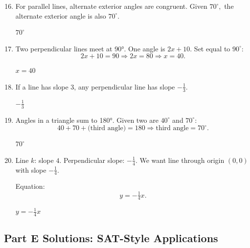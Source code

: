 \documentclass[14pt]{extarticle}
\begin{document}
\begin{enumerate}
  \setcounter{enumi}{15}
  \item For parallel lines, alternate exterior angles are congruent.  
  Given \(70^\circ,\) the alternate exterior angle is also \(70^\circ.\)

  \(\boxed{70^\circ}\)

  \item Two perpendicular lines meet at 90°.  
  One angle is \(2x + 10.\) Set equal to \(90^\circ:\)
  \[
  2x + 10 = 90
  \Rightarrow 2x = 80
  \Rightarrow x = 40.
  \]

  \(\boxed{x = 40}\)

  \item If a line has slope 3, any perpendicular line has slope \(-\tfrac{1}{3}.\)

  \(\boxed{-\tfrac{1}{3}}\)

  \item Angles in a triangle sum to 180°.  
  Given two are \(40^\circ\) and \(70^\circ:\)
  \[
  40 + 70 + \text{(third angle)} = 180
  \Rightarrow \text{third angle} = 70^\circ.
  \]

  \(\boxed{70^\circ}\)

  \item Line \(k\): slope \(4\).  
  Perpendicular slope: \(-\tfrac{1}{4}.\)  
  We want line through origin \((0,0)\) with slope \(-\tfrac{1}{4}.\)

  Equation:
  \[
  y = -\tfrac{1}{4}x.
  \]

  \(\boxed{y = -\tfrac{1}{4}x}\)
\end{enumerate}

\subsection*{Part E Solutions: SAT-Style Applications}
\end{document}
